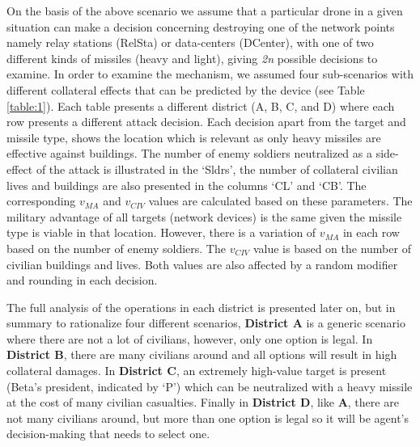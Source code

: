 On the basis of the above scenario we assume that a particular drone in a given situation can make a decision concerning destroying one of the network points namely relay stations (RelSta) or data-centers (DCenter), with one of two different kinds of missiles (heavy and light), giving \textit{2n} possible decisions to examine. In order to examine the mechanism, we assumed four sub-scenarios with different collateral effects that can be predicted by the device (see Table \ref{table:1}). Each table presents a different district (A, B, C, and D) where each row presents a different attack decision. Each decision apart from the target and missile type, shows the location which is relevant as only heavy missiles are effective against buildings. The number of enemy soldiers neutralized as a side-effect of the attack is illustrated in the `Sldrs', the number of collateral civilian lives and buildings are also presented in the columns `CL' and `CB'. The corresponding $v_{MA}$ and $v_{CIV}$ values are calculated based on these parameters. The military advantage of all targets (network devices) is the same given the missile type is viable in that location. However, there is a variation of $v_{MA}$ in each row based on the number of enemy soldiers. The $v_{CIV}$ value is based on the number of civilian buildings and lives. Both values are also affected by a random modifier and rounding in each decision.

The full analysis of the operations in each district is presented later on, but in summary to rationalize four different scenarios, \textbf{District A} is a generic scenario where there are not a lot of civilians, however, only one option is legal. In \textbf{District B}, there are many civilians around and all options will result in high collateral damages. In \textbf{District C}, an extremely high-value target is present (Beta's president, indicated by `P') which can be neutralized with a heavy missile at the cost of many civilian casualties. Finally in \textbf{District D}, like \textbf{A}, there are not many civilians around, but more than one option is legal so it will be agent's decision-making that needs to select one.




